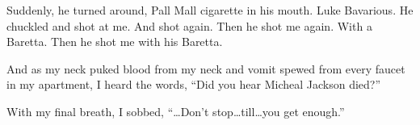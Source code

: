 Suddenly, he turned around, Pall Mall cigarette in his mouth. Luke
Bavarious. He chuckled and shot at me. And shot again. Then he shot
me again. With a Baretta. Then he shot me with his Baretta.



And as my neck puked blood from my neck and vomit spewed from every
faucet in my apartment, I heard the words, ``Did you hear Micheal
Jackson died?''



With my final breath, I sobbed, ``{\ldots}Don't stop{\ldots}till{\ldots}you get
enough.'' 
 






